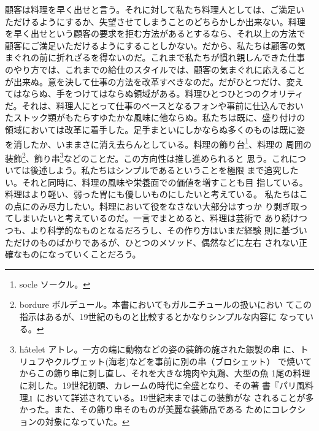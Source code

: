 顧客は料理を早く出せと言う。それに対して私たち料理人としては、ご満足い
ただけるようにするか、失望させてしまうことのどちらかしか出来ない。料理
を早く出せという顧客の要求を拒む方法があるとするなら、それ以上の方法で
顧客にご満足いただけるようにすることしかない。だから、私たちは顧客の気
まぐれの前に折れざるを得ないのだ。これまで私たちが慣れ親しんできた仕事
のやり方では、これまでの給仕のスタイルでは、顧客の気まぐれに応えること
が出来ぬ。意を決して仕事の方法を改革すべきなのだ。だがひとつだけ、変え
てはならぬ、手をつけてはならぬ領域がある。料理ひとつひとつのクオリティ
だ。それは、料理人にとって仕事のベースとなるフォンや事前に仕込んでおい
たストック類がもたらすゆたかな風味に他ならぬ。私たちは既に、盛り付けの
領域においては改革に着手した。足手まといにしかならぬ多くのものは既に姿
を消したか、いままさに消え去らんとしている。料理の飾り台\footnote{socle
  ソークル。}、料理の 周囲の装飾\footnote{bordure
  ボルデュール。本書においてもガルニチュールの扱いにおい
  てこの指示はあるが、19世紀のものと比較するとかなりシンプルな内容に
  なっている。}、飾り串\footnote{hâtelet
  アトレ。一方の端に動物などの姿の装飾の施された銀製の串
  に、トリュフやクルヴェット(海老)などを事前に別の串（ブロシェット）
  で焼いてからこの飾り串に刺し直し、それを大きな塊肉や丸鶏、大型の魚
  1尾の料理に刺した。19世紀初頭、カレームの時代に全盛となり、その著
  書『パリ風料理』において詳述されている。19世紀末まではこの装飾がな
  されることが多かった。また、その飾り串そのものが美麗な装飾品である
  ためにコレクションの対象になっていた。}などのことだ。この方向性は推し進められると
思う。これについては後述しよう。私たちはシンプルであるということを極限
まで追究したい。それと同時に、料理の風味や栄養面での価値を増すことも目
指している。料理はより軽い、弱った胃にも優しいものにしたいと考えている。
私たちはこの点にのみ尽力したい。料理において役をなさない大部分はすっか
り剥ぎ取ってしまいたいと考えているのだ。一言でまとめると、料理は芸術で
あり続けつつも、より科学的なものとなるだろうし、その作り方はいまだ経験
則に基づいただけのものばかりであるが、ひとつのメソッド、偶然などに左右
されない正確なものになっていくことだろう。


